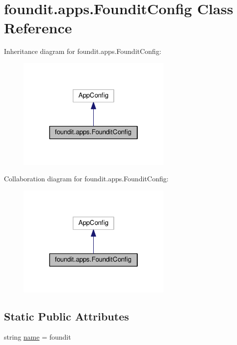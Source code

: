 \hypertarget{classfoundit_1_1apps_1_1_foundit_config}{}\section{foundit.\+apps.\+Foundit\+Config Class Reference}
\label{classfoundit_1_1apps_1_1_foundit_config}


Inheritance diagram for foundit.\+apps.\+Foundit\+Config\+:\nopagebreak
\begin{figure}[H]
\begin{center}
\leavevmode
\includegraphics[width=214pt]{classfoundit_1_1apps_1_1_foundit_config__inherit__graph}
\end{center}
\end{figure}


Collaboration diagram for foundit.\+apps.\+Foundit\+Config\+:\nopagebreak
\begin{figure}[H]
\begin{center}
\leavevmode
\includegraphics[width=214pt]{classfoundit_1_1apps_1_1_foundit_config__coll__graph}
\end{center}
\end{figure}
\subsection*{Static Public Attributes}
\begin{DoxyCompactItemize}
\item 
string \hyperlink{classfoundit_1_1apps_1_1_foundit_config_a6acdf3587456db7401bd4701743c6b9d}{name} = \textquotesingle{}foundit\textquotesingle{}
\end{DoxyCompactItemize}


